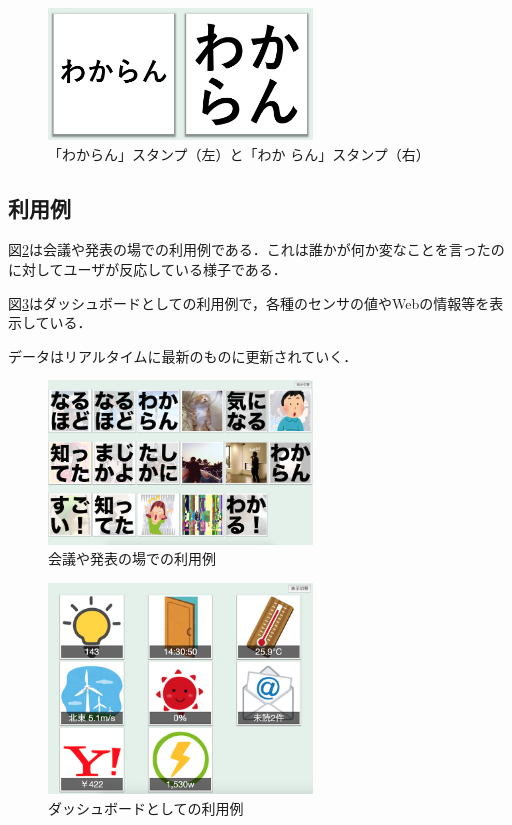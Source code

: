 \begin{figure}[h]
\centering
\includegraphics[width=7cm]{images/wakaran.png}
\caption{「わからん」スタンプ（左）と「わか らん」スタンプ（右）}
\label{wakaran}
\end{figure}

\subsection{利用例}
図\ref{discussion}は会議や発表の場での利用例である．これは誰かが何か変なことを言ったのに対してユーザが反応している様子である．

図\ref{sensors}はダッシュボードとしての利用例で，各種のセンサの値やWebの情報等を表示している．

データはリアルタイムに最新のものに更新されていく．

\begin{figure}[h]
\centering
\includegraphics[width=7cm]{images/discussion.png}
\caption{会議や発表の場での利用例}
\label{discussion}
\end{figure}

\begin{figure}[h]
\centering
\includegraphics[width=7cm]{images/sensors.png}
\caption{ダッシュボードとしての利用例}
\label{sensors}
\end{figure}